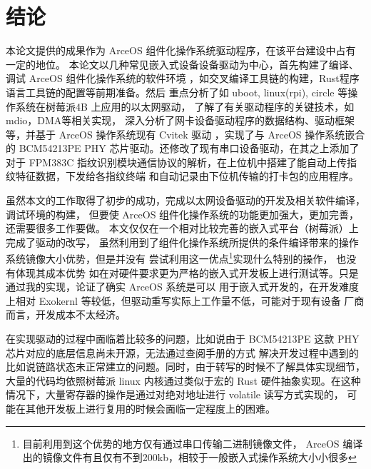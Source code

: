 \section{结论}

本论文提供的成果作为 ArceOS 组件化操作系统驱动程序，在该平台建设中占有一定的地位。
本论文以几种常见嵌入式设备设备驱动为中心，首先构建了编译、调试 ArceOS 组件化操作系统的软件环境
，如交叉编译工具链的构建，Rust程序语言工具链的配置等前期准备。然后
重点分析了如 uboot, linux(rpi), circle 等操作系统在树莓派4B 上应用的以太网驱动，
了解了有关驱动程序的关键技术，如mdio，DMA等相关实现，
深入分析了网卡设备驱动程序的数据结构、驱动框架等，并基于 ArceOS 操作系统现有 Cvitek 驱动
，实现了与 ArceOS 操作系统嵌合的 BCM54213PE PHY 芯片驱动。还修改了现有串口设备驱动，在其之上添加了
对于 FPM383C 指纹识别模块通信协议的解析，在上位机中搭建了能自动上传指纹特征数据，下发给各指纹终端
和自动记录由下位机传输的打卡包的应用程序。

虽然本文的工作取得了初步的成功，完成以太网设备驱动的开发及相关软件编译，调试环境的构建，
但要使 ArceOS 组件化操作系统的功能更加强大，更加完善，还需要很多工作要做。
本文仅仅在一个相对比较完善的嵌入式平台（树莓派）上完成了驱动的改写，
虽然利用到了组件化操作系统所提供的条件编译带来的操作系统镜像大小优势，但是并没有
尝试利用这一优点\footnote{目前利用到这个优势的地方仅有通过串口传输二进制镜像文件，
ArceOS 编译出的镜像文件有且仅有不到200kb，相较于一般嵌入式操作系统大小小很多}实现什么特别的操作，
也没有体现其成本优势
如在对硬件要求更为严格的嵌入式开发板上进行测试等。只是通过我的实现，论证了确实 ArceOS 系统是可以
用于嵌入式开发的，在开发难度上相对 Exokernl 等较低，但驱动重写实际上工作量不低，可能对于现有设备
厂商而言，开发成本不太经济。

在实现驱动的过程中面临着比较多的问题，比如说由于 BCM54213PE 这款 PHY 芯片对应的底层信息尚未开源，无法通过查阅手册的方式
解决开发过程中遇到的比如说链路状态未正常建立的问题。同时，由于转写的时候不了解具体实现细节，大量的代码均依照树莓派 linux
内核通过类似于宏的 Rust 硬件抽象实现。在这种情况下，大量寄存器的操作是通过对绝对地址进行 volatile 读写方式实现的，
可能在其他开发板上进行复用的时候会面临一定程度上的困难。